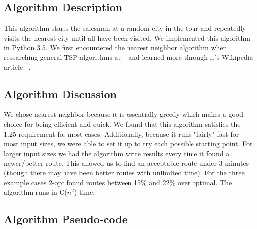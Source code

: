 \documentclass[../report/main.tex]{subfiles}
\begin{document}
\subsection*{Algorithm Description}

This algorithm starts the salesman at a random city in the tour and repeatedly visits the nearest city until all have been visited. We implemented this algorithm in Python 3.5.  We first encountered the nearest neighbor algorithm when researching general TSP algorithms at ~\cite{wikipedia/TSP} and learned more through it's Wikipedia article ~\cite{wikipedia/NN}.

\subsection*{Algorithm Discussion}

We chose nearest neighbor because it is essentially greedy which makes a good choice for being efficient and quick. We found that this algorithm satisfies the 1.25 requirement for most cases.  Additionally, because it runs "fairly" fast for most input sizes, we were able to set it up to try each possible starting point.  For larger input sizes we had the algorithm write results every time it found a newer/better route.  This allowed us to find an acceptable route under 3 minutes (though there may have been better routes with unlimited time).  For the three example cases 2-opt found routes between 15\% and 22\% over optimal.  The algorithm runs in O($n^2$) time.

\subsection*{Algorithm Pseudo-code}
\end{document}

